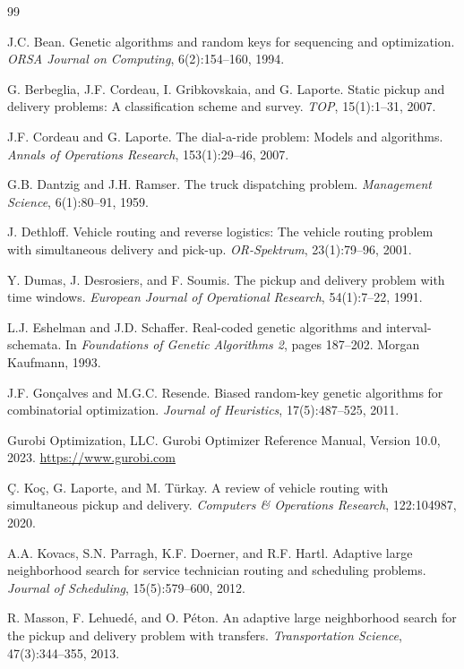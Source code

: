 \documentclass[sigconf]{acmart}
\begin{document}

\begin{thebibliography}{99}

J.C. Bean.
Genetic algorithms and random keys for sequencing and optimization.
{\em ORSA Journal on Computing}, 6(2):154--160, 1994.

G. Berbeglia, J.F. Cordeau, I. Gribkovskaia, and G. Laporte.
Static pickup and delivery problems: A classification scheme and survey.
{\em TOP}, 15(1):1--31, 2007.

J.F. Cordeau and G. Laporte.
The dial-a-ride problem: Models and algorithms.
{\em Annals of Operations Research}, 153(1):29--46, 2007.

G.B. Dantzig and J.H. Ramser.
The truck dispatching problem.
{\em Management Science}, 6(1):80--91, 1959.

J. Dethloff.
Vehicle routing and reverse logistics: The vehicle routing problem with simultaneous delivery and pick-up.
{\em OR-Spektrum}, 23(1):79--96, 2001.

Y. Dumas, J. Desrosiers, and F. Soumis.
The pickup and delivery problem with time windows.
{\em European Journal of Operational Research}, 54(1):7--22, 1991.

L.J. Eshelman and J.D. Schaffer.
Real-coded genetic algorithms and interval-schemata.
In {\em Foundations of Genetic Algorithms 2}, pages 187--202. Morgan Kaufmann, 1993.

J.F. Gon\c{c}alves and M.G.C. Resende.
Biased random-key genetic algorithms for combinatorial optimization.
{\em Journal of Heuristics}, 17(5):487--525, 2011.

Gurobi Optimization, LLC.
Gurobi Optimizer Reference Manual, Version 10.0, 2023.
\url{https://www.gurobi.com}

\c{C}. Ko\c{c}, G. Laporte, and M. T\"{u}rkay.
A review of vehicle routing with simultaneous pickup and delivery.
{\em Computers \& Operations Research}, 122:104987, 2020.

A.A. Kovacs, S.N. Parragh, K.F. Doerner, and R.F. Hartl.
Adaptive large neighborhood search for service technician routing and scheduling problems.
{\em Journal of Scheduling}, 15(5):579--600, 2012.

R. Masson, F. Lehued{\'e}, and O. P{\'e}ton.
An adaptive large neighborhood search for the pickup and delivery problem with transfers.
{\em Transportation Science}, 47(3):344--355, 2013.


\end{thebibliography}
\end{document}
